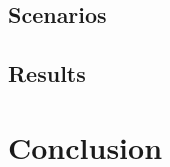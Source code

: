 \documentclass[10pt, conference]{templates/IEEEtran}
\begin{document}
\subsection{Scenarios}


\subsection{Results}


\section{Conclusion}



% 

% 



\end{document}
